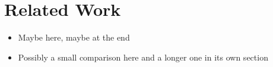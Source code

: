 \section{Related Work}
\begin{itemize}
  \item Maybe here, maybe at the end
  \item Possibly a small comparison here and a longer one in its own section
\end{itemize}
